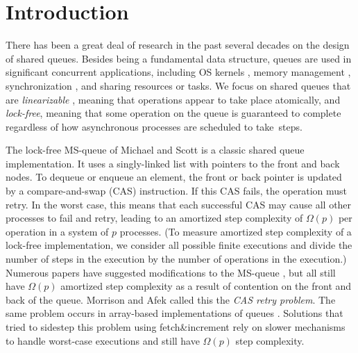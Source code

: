 
\section{Introduction}

There has been a great deal of research in the past several decades on the design of shared queues.
Besides being a fundamental data structure, queues are used in
significant concurrent applications, including OS kernels \cite{MP91}, memory management \cite{BBFRSW21},
synchronization \cite{KAE23},
and sharing resources or tasks.
We focus on shared queues that are \emph{linearizable} \cite{HW90}, meaning that operations
appear to take place atomically, and \emph{lock-free}, meaning that some operation on the queue
is guaranteed to complete regardless of how asynchronous processes are scheduled to take~steps.

The lock-free MS-queue of Michael and Scott \cite{MS98} is a classic shared queue implementation.
It uses a singly-linked list with pointers to the front and back nodes.
To dequeue or enqueue an element, the front or back pointer is updated by a 
compare-and-swap (CAS) instruction.
If this CAS fails, the operation must retry.
In the worst case, this means that each successful CAS may cause all other processes to
fail and retry, leading to an amortized step complexity of $\Omega(p)$ per operation in a system of $p$ processes.
(To measure amortized step complexity of a lock-free implementation, we consider all possible finite executions
and divide the number of steps in the execution by the number of operations  in the execution.)
Numerous papers have suggested modifications to the MS-queue \cite{DBLP:conf/opodis/HoffmanSS07,DBLP:conf/podc/KoganH14,DBLP:conf/ppopp/KoganP11,DBLP:journals/dc/Ladan-MozesS08,MKLLP22,DBLP:conf/spaa/MoirNSS05,RC17}, but 
all still have $\Omega(p)$ amortized step complexity as a result of
contention on the front and back of the queue.
Morrison and Afek \cite{DBLP:conf/ppopp/MorrisonA13} called this the \emph{CAS retry problem}.
The same problem occurs in array-based implementations of queues \cite{DBLP:conf/iceccs/ColvinG05,DBLP:conf/icdcn/Shafiei09,DBLP:conf/spaa/TsigasZ01,DBLP:conf/opodis/GidenstamST10}.
Solutions that tried to sidestep this problem using fetch\&increment \cite{DBLP:conf/ppopp/MorrisonA13,DBLP:conf/ppopp/YangM16,Nik19,10.1145/3490148.3538572}
rely on slower mechanisms to handle worst-case executions and still have $\Omega(p)$ step complexity.

